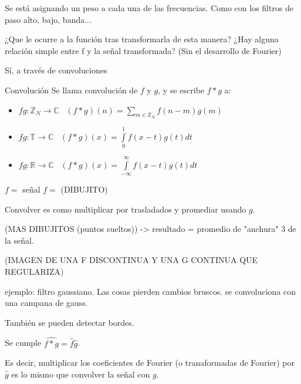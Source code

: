 Se está asignando un peso a cada una de las frecuencias. Como con los filtros de paso alto, bajo, banda... 

¿Que le ocurre a la función tras transformarla de esta manera? ¿Hay alguna relación simple entre f y la señal transformada? (Sin el desarrollo de Fourier)

Sí, a través de convoluciones

\begin{defn}{Convolución}
	Se llama convolución de $f$ y $g$, y se escribe $f*g$ a:
	\begin{itemize}
		\item $fg :\mathbb{Z}_{N} \rightarrow \mathbb{C} \;\;\; (f * g)(n) = \sum\limits_{m \in \mathbb{Z}_{N}} f(n-m)g(m)$
		\item $fg :\mathbb{T} \rightarrow \mathbb{C} \;\;\; (f * g)(x) = \int\limits^{1}_{0} f(x-t)g(t)dt$
		\item $fg :\mathbb{R} \rightarrow \mathbb{C} \;\;\; (f * g)(x) = \int\limits^{\infty}_{-\infty} f(x-t)g(t)dt$ 
	\end{itemize}

\end{defn}

\begin{obs}

$f =$ señal $f = $ (DIBUJITO)

Convolver es como multiplicar por trasladados y promediar usando $g$.


(MAS DIBUJITOS (puntos sueltos)) -> resultado = promedio de "anchura" 3 de la señal.

(IMAGEN DE UNA F DISCONTINUA Y UNA G CONTINUA QUE REGULARIZA)


ejemplo: filtro gaussiano. Las cosas pierden cambios bruscos. se convoluciona con una campana de gauss.

También se pueden detectar bordes.

\end{obs}


\begin{prop}
	Se cumple $\hat{f*g} = \hat{f} \hat{g}$.

	Es decir, multiplicar los coeficientes de Fourier (o tranaformadas de Fourier) por $\hat{g}$ es lo mismo que convolver la señal con $g$.

\end{prop}

